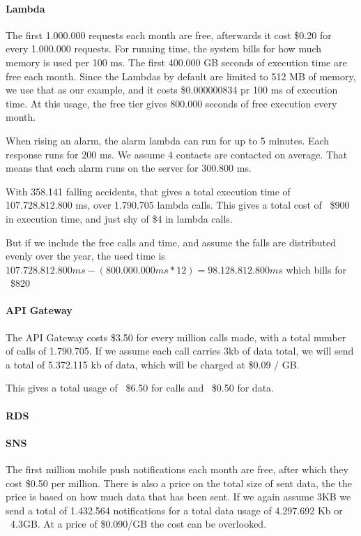 \paragraph{Lambda}

The first 1.000.000 requests each month are free, afterwards it cost \$0.20 for every 1.000.000 requests.
For running time, the system bills for how much memory is used per 100 ms. The first 400.000 GB seconds of execution time are free each month. Since the Lambdas by default are limited to 512 MB of memory, we use that as our example, and it costs \$0.000000834 pr 100 ms of execution time. At this usage, the free tier gives 800.000 seconds of free execution every month.

When rising an alarm, the alarm lambda can run for up to 5 minutes. Each response runs for 200 ms. We assume 4 contacts are contacted on average. That means that each alarm runs on the server for 300.800 ms.

With 358.141 falling accidents, that gives a total execution time of 107.728.812.800 ms, over 1.790.705 lambda calls.
This gives a total cost of ~\$900 in execution time, and just shy of \$4 in lambda calls.

But if we include the free calls and time, and assume the falls are distributed evenly over the year, the used time is $107.728.812.800 ms - (800.000.000 ms * 12) = 98.128.812.800 ms$ which bills for ~\$820

\paragraph{API Gateway}

The API Gateway costs \$3.50 for every million calls made, with a total number of calls of 1.790.705. If we assume each call carries 3kb of data total, we will send a total of 5.372.115 kb of data, which will be charged at \$0.09 / GB.

This gives a total usage of ~\$6.50 for calls and ~\$0.50 for data.

\paragraph{RDS}


\paragraph{SNS}

The first million mobile push notifications each month are free, after which they cost \$0.50 per million. There is also a price on the total size of sent data, the the price is based on how much data that has been sent. If we again assume 3KB we send a total of 1.432.564 notifications for a total data usage of 4.297.692 Kb or ~4.3GB. At a price of \$0.090/GB the cost can be overlooked.

